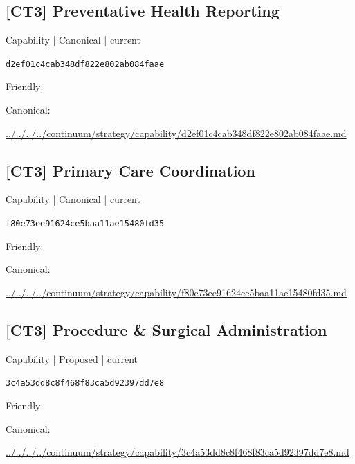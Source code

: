 \documentclass[10pt,a4paper]{article}
\begin{document}
\subsection*{[CT3] Preventative Health Reporting}
{\small Capability | Canonical | current}\par
\texttt{d2ef01c4cab348df822e802ab084faae}\par
Friendly: \par
Canonical: \par
{\footnotesize\url{../../../../continuum/strategy/capability/d2ef01c4cab348df822e802ab084faae.md}}\par
\subsection*{[CT3] Primary Care Coordination}
{\small Capability | Canonical | current}\par
\texttt{f80e73ee91624ce5baa11ae15480fd35}\par
Friendly: \par
Canonical: \par
{\footnotesize\url{../../../../continuum/strategy/capability/f80e73ee91624ce5baa11ae15480fd35.md}}\par
\subsection*{[CT3] Procedure \& Surgical Administration}
{\small Capability | Proposed | current}\par
\texttt{3c4a53dd8c8f468f83ca5d92397dd7e8}\par
Friendly: \par
Canonical: \par
{\footnotesize\url{../../../../continuum/strategy/capability/3c4a53dd8c8f468f83ca5d92397dd7e8.md}}\par
\end{document}
